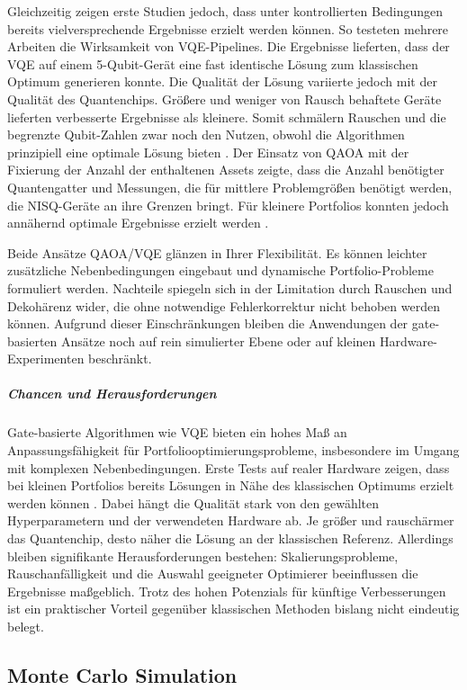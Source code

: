 Gleichzeitig zeigen erste Studien jedoch, dass unter kontrollierten Bedingungen bereits vielversprechende Ergebnisse erzielt werden können. So testeten mehrere Arbeiten die Wirksamkeit von VQE-Pipelines. Die Ergebnisse lieferten, dass der VQE auf einem 5-Qubit-Gerät eine fast identische Lösung zum klassischen Optimum generieren konnte. Die Qualität der Lösung variierte jedoch mit der Qualität des Quantenchips. Größere und weniger von Rausch behaftete Geräte lieferten verbesserte Ergebnisse als kleinere. Somit schmälern Rauschen und die begrenzte Qubit-Zahlen zwar noch den Nutzen, obwohl die Algorithmen prinzipiell eine optimale Lösung bieten \cite{buonaiuto_best_2023}.
Der Einsatz von QAOA mit der Fixierung der Anzahl der enthaltenen Assets zeigte, dass die Anzahl benötigter Quantengatter und Messungen, die für mittlere Problemgrößen benötigt werden, die NISQ-Geräte an ihre Grenzen bringt. Für kleinere Portfolios konnten jedoch annähernd optimale Ergebnisse erzielt werden \cite{brandhofer_benchmarking_2022}.
 
Beide Ansätze QAOA/VQE glänzen in Ihrer Flexibilität. Es können leichter zusätzliche Nebenbedingungen eingebaut und dynamische Portfolio-Probleme formuliert werden. Nachteile spiegeln sich in der Limitation durch Rauschen und Dekohärenz wider, die ohne notwendige Fehlerkorrektur nicht behoben werden können. Aufgrund dieser Einschränkungen bleiben die Anwendungen der gate-basierten Ansätze noch auf rein simulierter Ebene oder auf kleinen Hardware-Experimenten beschränkt.

\subparagraph{Chancen und Herausforderungen}

Gate-basierte Algorithmen wie VQE bieten ein hohes Maß an Anpassungsfähigkeit für Portfoliooptimierungsprobleme, insbesondere im Umgang mit komplexen Nebenbedingungen. Erste Tests auf realer Hardware zeigen, dass bei kleinen Portfolios bereits Lösungen in Nähe des klassischen Optimums erzielt werden können \cite[S. 2–4]{buonaiuto_best_2023}. Dabei hängt die Qualität stark von den gewählten Hyperparametern und der verwendeten Hardware ab. Je größer und rauschärmer das Quantenchip, desto näher die Lösung an der klassischen Referenz. Allerdings bleiben signifikante Herausforderungen bestehen: Skalierungsprobleme, Rauschanfälligkeit und die Auswahl geeigneter Optimierer beeinflussen die Ergebnisse maßgeblich. Trotz des hohen Potenzials für künftige Verbesserungen ist ein praktischer Vorteil gegenüber klassischen Methoden bislang nicht eindeutig belegt.

\subsection{ Monte Carlo Simulation}

